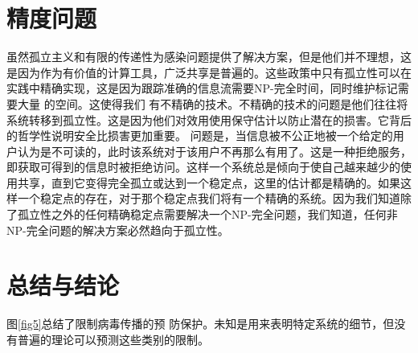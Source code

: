 \section{精度问题}

虽然孤立主义和有限的传递性为感染问题提供了解决方案，但是他们并不理想，这是因为作为有价值的计算工具，广泛共享是普遍的。这些政策中只有孤立性可以在实践中精确实现，这是因为跟踪准确的信息流需要NP-完全时间，同时维护标记需要大量
的空间。这使得我们
有不精确的技术。不精确的技术的问题是他们往往将系统转移到孤立性。这是因为他们对效用使用保守估计以防止潜在的损害。它背后的哲学性说明安全比损害更加重要。
问题是，当信息被不公正地被一个给定的用户认为是不可读的，此时该系统对于该用户不再那么有用了。这是一种拒绝服务，即获取可得到的信息时被拒绝访问。这样一个系统总是倾向于使自己越来越少的使用共享，直到它变得完全孤立或达到一个稳定点，这里的估计都是精确的。如果这样一个稳定点的存在，对于那个稳定点我们将有一个精确的系统。因为我们知道除了孤立性之外的任何精确稳定点需要解决一个NP-完全问题，我们知道，任何非NP-完全问题的解决方案必然趋向于孤立性。

\section{总结与结论}

图\ref{fig5}总结了限制病毒传播的预
防保护。未知是用来表明特定系统的细节，但没有普遍的理论可以预测这些类别的限制。









